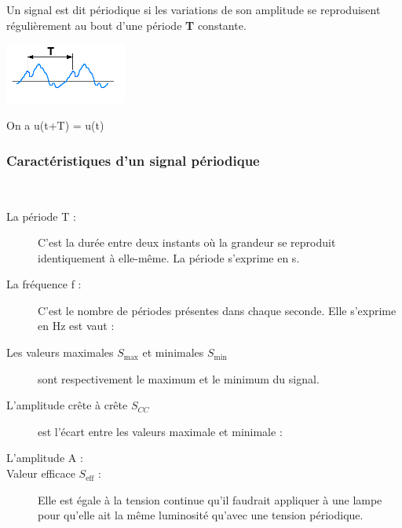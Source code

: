 \documentclass[10pt,fleqn]{article} %
\begin{document}
    \begin{defi}
        Un signal est dit périodique si les variations de son amplitude se reproduisent régulièrement au bout d'une période \textbf{T} constante.

        \begin{center}
            \includegraphics[width=0.3\textwidth]{images/Signal_periodique.png}
        \end{center}

        On a u(t+T) = u(t)
    \end{defi}

    \subsubsection{Caractéristiques d'un signal périodique}
    \begin{aretenir}~
    \begin{description}
        \item[La période T :] C'est la durée entre deux instants où la grandeur se reproduit identiquement à elle-même. La période s'exprime en \si{s}.

        \item[La fréquence f :] C'est le nombre de périodes présentes dans chaque seconde. Elle s'exprime en \si{Hz} est vaut :
        \begin{center}
        \end{center}
        \item[Les valeurs maximales $S_{\text{max}}$ et minimales $S_{\text{min}}$] sont respectivement le maximum et le minimum du signal.
        \item[L'amplitude crête à crête $S_{CC}$] est l'écart entre les valeurs maximale et minimale : 
        \item[L'amplitude A :] 
        \item[Valeur efficace $S_\text{eff}$ : ] Elle est égale à la tension continue qu'il faudrait appliquer à une lampe pour qu'elle ait la même luminosité qu'avec une tension périodique.
    \end{description}
    \end{aretenir}
\end{document}
